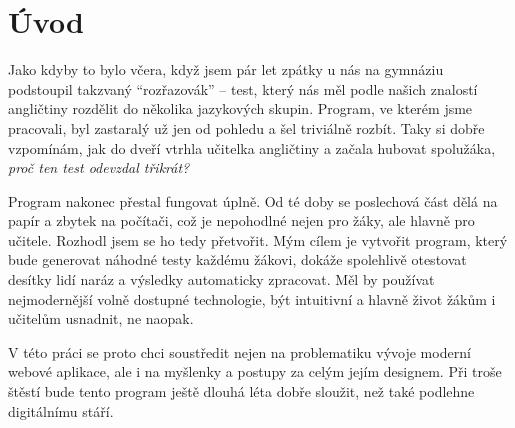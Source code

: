 \chapter*{Úvod}

Jako kdyby to bylo včera, když jsem pár let zpátky u nás na gymnáziu podstoupil takzvaný \enquote{rozřazovák} -- test, který nás měl podle našich znalostí angličtiny rozdělit do několika jazykových skupin. Program, ve kterém jsme pracovali, byl zastaralý už jen od pohledu a šel triviálně rozbít. Taky si dobře vzpomínám, jak do dveří vtrhla učitelka angličtiny a začala hubovat spolužáka, \textit{proč ten test odevzdal třikrát?}

Program nakonec přestal fungovat úplně. Od té doby se poslechová část dělá na papír a zbytek na počítači, což je nepohodlné nejen pro žáky, ale hlavně pro učitele. Rozhodl jsem se ho tedy přetvořit. Mým cílem je vytvořit program, který bude generovat náhodné testy každému žákovi, dokáže spolehlivě otestovat desítky lidí naráz a výsledky automaticky zpracovat. Měl by používat nejmodernější volně dostupné technologie, být intuitivní a hlavně život žákům i učitelům usnadnit, ne naopak.

V této práci se proto chci soustředit nejen na problematiku vývoje moderní webové aplikace, ale i na myšlenky a postupy za celým jejím designem. Při troše štěstí bude tento program ještě dlouhá léta dobře sloužit, než také podlehne digitálnímu stáří.